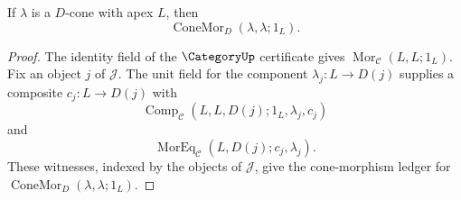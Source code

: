 \begin{lemma}\label{lem:catlimit-cone-identity-comparison}
If $\lambda$ is a $D$-cone with apex $L$, then
$$\operatorname{ConeMor}_{D}(\lambda,\lambda;1_L).$$
\end{lemma}
\begin{proof}
The identity field of the $\CategoryUp$ certificate gives $\operatorname{Mor}_{\mathcal C}(L,L;1_L)$. Fix an object $j$ of $\mathcal J$. The unit field for the component $\lambda_j:L\to D(j)$ supplies a composite $c_j:L\to D(j)$ with
$$\operatorname{Comp}_{\mathcal C}(L,L,D(j);1_L,\lambda_j,c_j)$$
and
$$\operatorname{MorEq}_{\mathcal C}(L,D(j);c_j,\lambda_j).$$
These witnesses, indexed by the objects of $\mathcal J$, give the cone-morphism ledger for $\operatorname{ConeMor}_{D}(\lambda,\lambda;1_L)$.
\end{proof}

